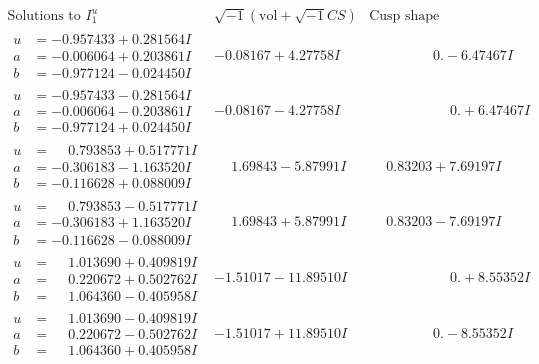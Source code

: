 \documentclass[1p]{elsarticle_modified}
\theoremstyle{definition}
\newcommand{\I}{\sqrt{-1}}
\begin{document}
$$\begin{array}{c|c|c}  
\text{Solutions to }I^u_{1}& \I (\text{vol} + \sqrt{-1}CS) & \text{Cusp shape}\\
 \hline 
\begin{aligned}
u &= -0.957433 + 0.281564 I \\
a &= -0.006064 + 0.203861 I \\
b &= -0.977124 - 0.024450 I\end{aligned}
 & -0.08167 + 4.27758 I & \phantom{-0.000000 } 0. - 6.47467 I \\ \hline\begin{aligned}
u &= -0.957433 - 0.281564 I \\
a &= -0.006064 - 0.203861 I \\
b &= -0.977124 + 0.024450 I\end{aligned}
 & -0.08167 - 4.27758 I & \phantom{-0.000000 -}0. + 6.47467 I \\ \hline\begin{aligned}
u &= \phantom{-}0.793853 + 0.517771 I \\
a &= -0.306183 - 1.163520 I \\
b &= -0.116628 + 0.088009 I\end{aligned}
 & \phantom{-}1.69843 - 5.87991 I & \phantom{-}0.83203 + 7.69197 I \\ \hline\begin{aligned}
u &= \phantom{-}0.793853 - 0.517771 I \\
a &= -0.306183 + 1.163520 I \\
b &= -0.116628 - 0.088009 I\end{aligned}
 & \phantom{-}1.69843 + 5.87991 I & \phantom{-}0.83203 - 7.69197 I \\ \hline\begin{aligned}
u &= \phantom{-}1.013690 + 0.409819 I \\
a &= \phantom{-}0.220672 + 0.502762 I \\
b &= \phantom{-}1.064360 - 0.405958 I\end{aligned}
 & -1.51017 - 11.89510 I & \phantom{-0.000000 -}0. + 8.55352 I \\ \hline\begin{aligned}
u &= \phantom{-}1.013690 - 0.409819 I \\
a &= \phantom{-}0.220672 - 0.502762 I \\
b &= \phantom{-}1.064360 + 0.405958 I\end{aligned}
 & -1.51017 + 11.89510 I & \phantom{-0.000000 } 0. - 8.55352 I \\ \hline\begin{aligned}

\end{aligned}
\end{array}$$
\end{document}
